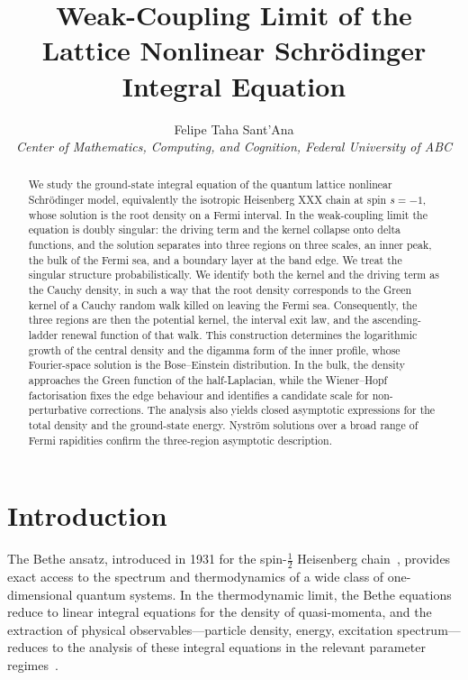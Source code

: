 \documentclass[11pt,a4paper]{article}
\title{\LARGE\bfseries Weak-Coupling Limit of the Lattice Nonlinear Schr\"odinger Integral Equation}
\author{Felipe Taha Sant'Ana \\ \small{\emph{Center of Mathematics, Computing, and Cognition, Federal University of ABC}}}
\date{}
\theoremstyle{definition}
\begin{document}
\maketitle
\pagestyle{plain}

\begin{abstract}
We study the ground-state integral equation of the quantum lattice nonlinear
Schr\"odinger model, equivalently the isotropic Heisenberg XXX chain at spin
$s = -1$, whose solution is the root density on a Fermi interval.
In the weak-coupling limit the equation is doubly singular: the driving term and
the kernel collapse onto delta functions, and the solution separates
into three regions on three scales, an inner peak, the bulk of the Fermi sea,
and a boundary layer at the band edge. 
We treat the singular structure probabilistically. We identify both the kernel 
and the driving term as  the Cauchy density, in such a way that the root density corresponds to the 
Green kernel of a Cauchy random walk killed on leaving the Fermi sea. Consequently, the three
regions are then the potential kernel, the interval exit law, and the
ascending-ladder renewal function of that walk.  
This construction determines the logarithmic growth of the central density and the digamma form of the inner profile, whose Fourier-space solution is the Bose--Einstein distribution.  In the bulk, the density approaches the Green function of the half-Laplacian, while the Wiener--Hopf factorisation fixes the edge behaviour and identifies a candidate scale for non-perturbative corrections. The analysis also yields closed asymptotic expressions for the total density and the ground-state energy.  Nystr\"om solutions over a broad range of Fermi rapidities confirm the three-region asymptotic description.
\end{abstract}

\tableofcontents


\section{Introduction}\label{sec.intro}

The Bethe ansatz, introduced in 1931 for the spin-$\frac{1}{2}$ Heisenberg
chain~\cite{Bethe1931}, provides exact access to the spectrum and thermodynamics of a
wide class of one-dimensional quantum systems.
In the thermodynamic limit, the Bethe equations reduce to linear integral equations
for the density of quasi-momenta, and the extraction of physical observables---particle
density, energy, excitation spectrum---reduces to the analysis of these integral equations
in the relevant parameter regimes~\cite{Gaudin2014,KorepinBogoliubovIzergin1993,Takahashi1999}.
\end{document}
